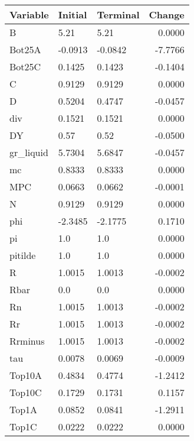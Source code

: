 \begin{table}
\centering
\label{tab:stst_comparison_baseline_limit_permanent}
\begin{tabular}{lllr}
\toprule
                Variable & Initial & Terminal &  Change \\
\midrule
                       B &    5.21 &     5.21 &  0.0000 \\
                  Bot25A & -0.0913 &  -0.0842 & -7.7766 \\
                  Bot25C &  0.1425 &   0.1423 & -0.1404 \\
                       C &  0.9129 &   0.9129 &  0.0000 \\
                       D &  0.5204 &   0.4747 & -0.0457 \\
                     div &  0.1521 &   0.1521 &  0.0000 \\
                      DY &    0.57 &     0.52 & -0.0500 \\
               gr\_liquid &  5.7304 &   5.6847 & -0.0457 \\
                      mc &  0.8333 &   0.8333 &  0.0000 \\
                     MPC &  0.0663 &   0.0662 & -0.0001 \\
                       N &  0.9129 &   0.9129 &  0.0000 \\
                     phi & -2.3485 &  -2.1775 &  0.1710 \\
                      pi &     1.0 &      1.0 &  0.0000 \\
                 pitilde &     1.0 &      1.0 &  0.0000 \\
                       R &  1.0015 &   1.0013 & -0.0002 \\
                    Rbar &     0.0 &      0.0 &  0.0000 \\
                      Rn &  1.0015 &   1.0013 & -0.0002 \\
                      Rr &  1.0015 &   1.0013 & -0.0002 \\
                 Rrminus &  1.0015 &   1.0013 & -0.0002 \\
                     tau &  0.0078 &   0.0069 & -0.0009 \\
                  Top10A &  0.4834 &   0.4774 & -1.2412 \\
                  Top10C &  0.1729 &   0.1731 &  0.1157 \\
                   Top1A &  0.0852 &   0.0841 & -1.2911 \\
                   Top1C &  0.0222 &   0.0222 &  0.0000 \\

\end{tabular}
\end{table}

